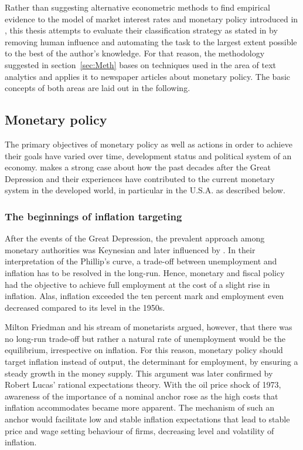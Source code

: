 
Rather than suggesting alternative econometric methods to find empirical evidence to the model of market interest rates and monetary policy introduced in \textcite{Ellingsen.2001}, this thesis attempts to evaluate their classification strategy as stated in \textcite{Ellingsen.2003} by removing human influence and automating the task to the largest extent possible to the best of the author's knowledge. For that reason, the methodology suggested in section~\ref{sec:Meth} bases on techniques used in the area of text analytics and applies it to newspaper articles about monetary policy. The basic concepts of both areas are laid out in the following.

\subsection{Monetary policy}

The primary objectives of monetary policy as well as actions in order to achieve their goals have varied over time, development status and  political system of an economy. \textcite{Mishkin.2007} makes a strong case about how the past decades after the Great Depression and their experiences have contributed to the current monetary system in the developed world, in particular in the U.S.A. as described below. 

\subsubsection{The beginnings of inflation targeting}
After the events of the Great Depression, the prevalent approach among monetary authorities was Keynesian and later influenced by \textcite{Samuelson.1960}. In their interpretation of the Phillip's curve, a trade-off between unemployment and inflation has to be resolved in the long-run. Hence, monetary and fiscal policy had the objective to achieve full employment at the cost of a slight rise in inflation. Alas, inflation exceeded the ten percent mark and employment even decreased compared to its level in the 1950s. 

Milton Friedman and his stream of monetarists argued, however, that there was no long-run trade-off but rather a natural rate of unemployment would be the equilibrium, irrespective on inflation. For this reason, monetary policy should target inflation instead of output, the determinant for employment, by ensuring a steady growth in the money supply. This argument was later confirmed by Robert Lucas' rational expectations theory. With the oil price shock of 1973, awareness of the importance of a nominal anchor rose as the high costs that inflation accommodates became more apparent. The mechanism of such an anchor would facilitate low and stable inflation expectations that lead to stable price and wage setting behaviour of firms, decreasing level and volatility of inflation.

